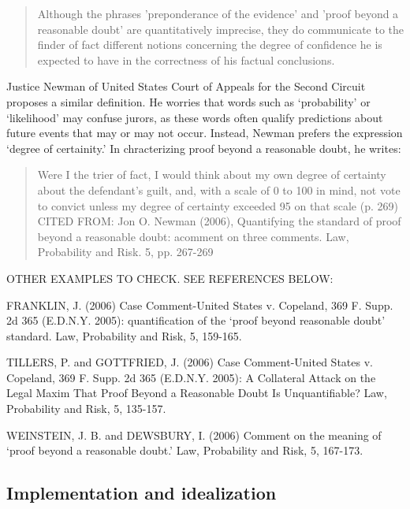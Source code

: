 \documentclass[
  10pt,
  dvipsnames,enabledeprecatedfontcommands]{scrartcl}
\begin{document}
\begin{quote}
Although the phrases 'preponderance of the evidence' and 'proof beyond a reasonable doubt' are quantitatively imprecise, they do communicate to the finder of fact different notions concerning the degree of confidence he is expected to have in the correctness of his factual conclusions.
\end{quote}

\noindent Justice Newman of United States Court of Appeals for the
Second Circuit proposes a similar definition. He worries that words such
as `probability' or `likelihood' may confuse jurors, as these words
often qualify predictions about future events that may or may not occur.
Instead, Newman prefers the expression `degree of certainity.' In
chracterizing proof beyond a reasonable doubt, he writes:

\begin{quote}
Were I the trier of fact, I would think about my own degree of certainty about the defendant's guilt, 
and, with a scale of 0 to 100 in mind, not vote to convict unless my degree of certainty 
exceeded 95 on that scale (p. 269) CITED FROM: Jon O. Newman (2006), Quantifying the standard of proof beyond a reasonable doubt: acomment on three comments. Law, Probability and Risk. 5, pp. 267-269
\end{quote}


OTHER EXAMPLES TO CHECK. SEE REFERENCES BELOW:

FRANKLIN, J. (2006) Case Comment-United States v. Copeland, 369 F. Supp.
2d 365 (E.D.N.Y. 2005): quantification of the `proof beyond reasonable
doubt' standard. Law, Probability and Risk, 5, 159-165.

TILLERS, P. and GOTTFRIED, J. (2006) Case Comment-United States v.
Copeland, 369 F. Supp. 2d 365 (E.D.N.Y. 2005): A Collateral Attack on
the Legal Maxim That Proof Beyond a Reasonable Doubt Is Unquantifiable?
Law, Probability and Risk, 5, 135-157.

WEINSTEIN, J. B. and DEWSBURY, I. (2006) Comment on the meaning of
`proof beyond a reasonable doubt.' Law, Probability and Risk, 5,
167-173.

\hypertarget{implementation-and-idealization}{%
\subsection{Implementation and
idealization}\label{implementation-and-idealization}}
\end{document}

